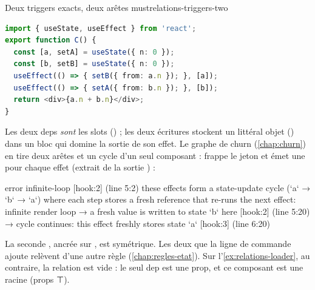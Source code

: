 \begin{exemple}{Deux triggers exacts, deux arêtes must}{relations-triggers-two}
\begin{lstlisting}[language=TypeScript,caption={\file{/tmp/relprobe/ex4.tsx}},label={lst:relations-triggers-two}]
import { useState, useEffect } from 'react';
export function C() {
  const [a, setA] = useState({ n: 0 });
  const [b, setB] = useState({ n: 0 });
  useEffect(() => { setB({ from: a.n }); }, [a]);
  useEffect(() => { setA({ from: b.n }); }, [b]);
  return <div>{a.n + b.n}</div>;
}
\end{lstlisting}
Les deux deps \emph{sont} les slots () ; les deux écritures stockent un littéral objet () dans un bloc qui domine la sortie de son effet. Le graphe de churn (\cref{chap:churn}) en tire deux arêtes  et un cycle  d'un seul composant :  frappe le jeton et  émet une \Error{} pour chaque effet (extrait de la sortie ) :
\begin{sortie}
    error  infinite-loop  [hook:2]  (line 5:2)  these effects form a state-update cycle (`a` → `b` → `a`) where each step stores a fresh reference that re-runs the next effect: infinite render loop
       → a fresh value is written to state `b` here [hook:2] (line 5:20)
       → cycle continues: this effect freshly stores state `a` [hook:3] (line 6:20)
\end{sortie}
La seconde \Error{}, ancrée sur \code{[hook:3]}, est symétrique. Les deux \Warning{}  que la ligne de commande ajoute relèvent d'une autre règle (\cref{chap:regles-etat}). Sur l'\cref{ex:relations-loader}, au contraire, la relation est vide : le seul dep est une prop, et ce composant est une racine (props ⊤).
\end{exemple}


